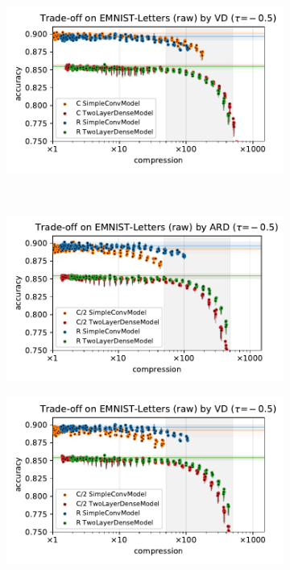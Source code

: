 \documentclass[a4paper,10pt,onecolumn]{article}
\begin{document}
\begin{figure}[b]
\begin{subfigure}[b]{0.5\columnwidth}
  \end{subfigure}%
  \begin{subfigure}[b]{0.5\columnwidth}
    \centering
    \includegraphics[width=\columnwidth]{figure__mnist-like__trade-off/appendix__VD__emnist_letters__raw__-0.5.pdf}
  \end{subfigure} \\ %
  \begin{subfigure}[b]{0.5\columnwidth}
    \centering
    \includegraphics[width=\columnwidth]{figure__mnist-like__trade-off/appendix__cmp__ARD__emnist_letters__raw__-0.5.pdf}
  \end{subfigure}%
  \begin{subfigure}[b]{0.5\columnwidth}
    \centering
    \includegraphics[width=\columnwidth]{figure__mnist-like__trade-off/appendix__cmp__VD__emnist_letters__raw__-0.5.pdf}

\end{subfigure}
\end{figure}
\end{document}

